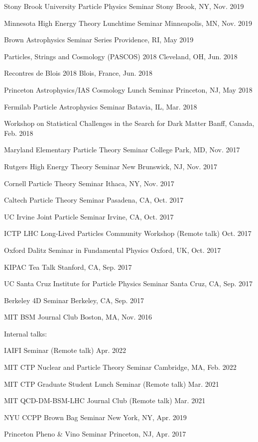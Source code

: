 \documentclass[letterpaper,11pt]{article}
\newenvironment{packed_itemize}{
\begin{itemize}[label=\raisebox{0.25ex}{\tiny$\bullet$}]
  \setlength{\itemsep}{3.9pt}
  \setlength{\parskip}{0pt}
  \setlength{\parsep}{0pt}}{\end{itemize}
}
\begin{document}
\begin{packed_itemize}
  \item Stony Brook University Particle Physics Seminar \hfill Stony Brook, NY, Nov. 2019
  \item Minnesota High Energy Theory Lunchtime Seminar \hfill  Minneapolis, MN, Nov. 2019
  \item Brown Astrophysics Seminar Series \hfill Providence, RI, May 2019
  \item Particles, Strings and Cosmology (PASCOS) 2018 \hfill Cleveland, OH, Jun. 2018
  \item Recontres de Blois 2018 \hfill Blois, France, Jun. 2018
  \item Princeton Astrophysics/IAS Cosmology Lunch Seminar \hfill Princeton, NJ, May 2018
  \item Fermilab Particle Astrophysics Seminar \hfill Batavia, IL, Mar. 2018
  \item Workshop on Statistical Challenges in the Search for Dark Matter \hfill Banff, Canada, Feb. 2018
  \item Maryland Elementary Particle Theory Seminar \hfill College Park, MD, Nov. 2017
  \item Rutgers High Energy Theory Seminar \hfill New Brunswick, NJ, Nov. 2017
  \item Cornell Particle Theory Seminar \hfill Ithaca, NY, Nov. 2017
  \item Caltech Particle Theory Seminar \hfill Pasadena, CA, Oct. 2017
  \item UC Irvine Joint Particle Seminar \hfill Irvine, CA, Oct. 2017
  \item ICTP LHC Long-Lived Particles Community Workshop (Remote talk) \hfill Oct. 2017
  \item Oxford Dalitz Seminar in Fundamental Physics  \hfill Oxford, UK, Oct. 2017
  \item KIPAC Tea Talk  \hfill Stanford, CA, Sep. 2017
  \item UC Santa Cruz Institute for Particle Physics Seminar  \hfill Santa Cruz, CA, Sep. 2017
  \item Berkeley 4D Seminar  \hfill Berkeley, CA, Sep. 2017
  \item MIT BSM Journal Club \hfill Boston, MA, Nov. 2016
\end{packed_itemize}

\noindent
Internal talks:
\begin{packed_itemize}
  \item IAIFI Seminar (Remote talk) \hfill Apr. 2022
  \item MIT CTP Nuclear and Particle Theory Seminar \hfill Cambridge, MA, Feb. 2022
  \item MIT CTP Graduate Student Lunch Seminar (Remote talk) \hfill Mar. 2021
  \item MIT QCD-DM-BSM-LHC Journal Club (Remote talk) \hfill Mar. 2021
  \item NYU CCPP Brown Bag Seminar \hfill New York, NY, Apr. 2019
  \item Princeton Pheno \& Vino Seminar \hfill Princeton, NJ, Apr. 2017
\end{packed_itemize}
\end{document}
